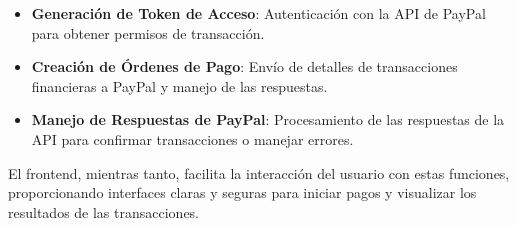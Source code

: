 \begin{itemize}
    \item \textbf{Generación de Token de Acceso}: Autenticación con la API de PayPal para obtener permisos de transacción.
    \item \textbf{Creación de Órdenes de Pago}: Envío de detalles de transacciones financieras a PayPal y manejo de las respuestas.
    \item \textbf{Manejo de Respuestas de PayPal}: Procesamiento de las respuestas de la API para confirmar transacciones o manejar errores.
\end{itemize}

El frontend, mientras tanto, facilita la interacción del usuario con estas funciones, proporcionando interfaces claras y seguras para iniciar pagos y visualizar los resultados de las transacciones.